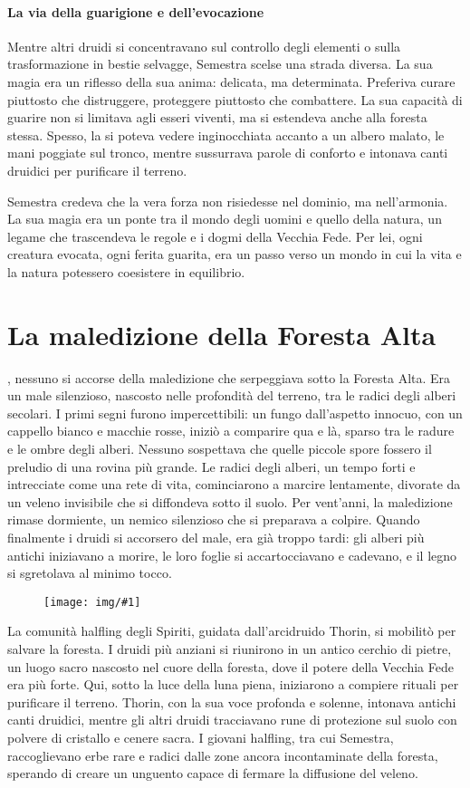 \documentclass[letterpaper,twocolumn,openany,nodeprecatedcode]{dndbook}
\newcommand{\Cap}[2]{\DndDropCapLine{#1}{#2}}
\newcommand{\image}[3]{%
  \begin{figure}[#3]
    \begin{tcolorbox}[
        enhanced,
        colframe=PhbTan,
        colback=white,
        opacityback=0,
        title={\vspace{0.2cm}\centering \sc  \textbf{#2}\vspace{0.2cm}},
        colbacktitle=PhbTan!50!PhbLightCyan,
        coltitle=black,
        fonttitle=\bfseries
    ]
    \texttt{[image: img/\#1]}
    \end{tcolorbox}
  \end{figure}
}
\begin{document}
\paragraph{La via della guarigione e dell’evocazione}

Mentre altri druidi si concentravano sul controllo degli elementi o sulla trasformazione in bestie selvagge, Semestra scelse una strada diversa. La sua magia era un riflesso della sua anima: delicata, ma determinata. Preferiva curare piuttosto che distruggere, proteggere piuttosto che combattere. La sua capacità di guarire non si limitava agli esseri viventi, ma si estendeva anche alla foresta stessa. Spesso, la si poteva vedere inginocchiata accanto a un albero malato, le mani poggiate sul tronco, mentre sussurrava parole di conforto e intonava canti druidici per purificare il terreno.

Semestra credeva che la vera forza non risiedesse nel dominio, ma nell’armonia. La sua magia era un ponte tra il mondo degli uomini e quello della natura, un legame che trascendeva le regole e i dogmi della Vecchia Fede. Per lei, ogni creatura evocata, ogni ferita guarita, era un passo verso un mondo in cui la vita e la natura potessero coesistere in equilibrio.

\section{La maledizione della Foresta Alta}

\Cap{A}{ll’inizio}, nessuno si accorse della maledizione che serpeggiava sotto la Foresta Alta. Era un male silenzioso, nascosto nelle profondità del terreno, tra le radici degli alberi secolari. I primi segni furono impercettibili: un fungo dall’aspetto innocuo, con un cappello bianco e macchie rosse, iniziò a comparire qua e là, sparso tra le radure e le ombre degli alberi. Nessuno sospettava che quelle piccole spore fossero il preludio di una rovina più grande. Le radici degli alberi, un tempo forti e intrecciate come una rete di vita, cominciarono a marcire lentamente, divorate da un veleno invisibile che si diffondeva sotto il suolo. Per vent’anni, la maledizione rimase dormiente, un nemico silenzioso che si preparava a colpire. Quando finalmente i druidi si accorsero del male, era già troppo tardi: gli alberi più antichi iniziavano a morire, le loro foglie si accartocciavano e cadevano, e il legno si sgretolava al minimo tocco.
\image{rituale.jpeg}{Rituale della Foresta}{h!}
La comunità halfling degli Spiriti, guidata dall’arcidruido Thorin, si mobilitò per salvare la foresta. I druidi più anziani si riunirono in un antico cerchio di pietre, un luogo sacro nascosto nel cuore della foresta, dove il potere della Vecchia Fede era più forte. Qui, sotto la luce della luna piena, iniziarono a compiere rituali per purificare il terreno. Thorin, con la sua voce profonda e solenne, intonava antichi canti druidici, mentre gli altri druidi tracciavano rune di protezione sul suolo con polvere di cristallo e cenere sacra. I giovani halfling, tra cui Semestra, raccoglievano erbe rare e radici dalle zone ancora incontaminate della foresta, sperando di creare un unguento capace di fermare la diffusione del veleno.
\end{document}
